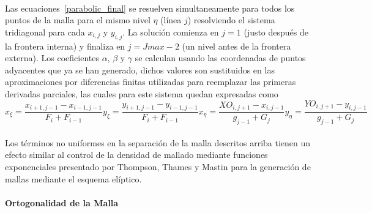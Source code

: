 \documentclass[letterpaper, openright, 12pt]{book}
\begin{document}
    \paragraph*{}
        Las ecuaciones~\ref{parabolic_final} se resuelven simultaneamente para
        todos los puntos de la malla para el mismo nivel $\eta$ (línea $j$)
        resolviendo el sistema tridiagonal para cada $x_{i, j}$ y $y_{i, j}$. La
        solución comienza en $j = 1$ (justo después de la frontera interna) y
        finaliza en $j = Jmax - 2$ (un nivel antes de la frontera externa). Los
        coeficientes $\alpha$, $\beta$ y $\gamma$ se calculan usando las
        coordenadas de puntos adyacentes que ya se han generado, dichos valores
        son sustituidos en las aproximaciones por diferencias finitas utilizadas
        para reemplazar las primeras derivadas parciales, las cuales para este
        sistema quedan expresadas como\\
        \begin{subequations}
            \begin{equation}
                x_\xi = \frac{x_{i+1, j-1} - x_{i-1, j-1}}{F_i + F_{i-1}}
            \end{equation}
            \begin{equation}
                y_\xi = \frac{y_{i+1, j-1} - y_{i-1, j-1}}{F_i + F_{i-1}}
            \end{equation}
            \begin{equation}
                x_\eta = \frac{XO_{i, j+1} - x_{i, j-1}}{g_{j-1} + G_j}
            \end{equation}
            \begin{equation}
                y_\eta = \frac{YO_{i, j+1} - y_{i, j-1}}{g_{j-1} + G_j}
            \end{equation}
        \end{subequations}
    \paragraph*{}
        Los términos no uniformes en la separación de la malla descritos arriba
        tienen un efecto similar al control de la densidad de mallado mediante
        funciones exponenciales presentado por Thompson, Thames y Mastin
        \cite{thompson1974automatic} para la generación de mallas mediante el
        esquema elíptico.
    \paragraph*{Ortogonalidad de la Malla}
\end{document}
